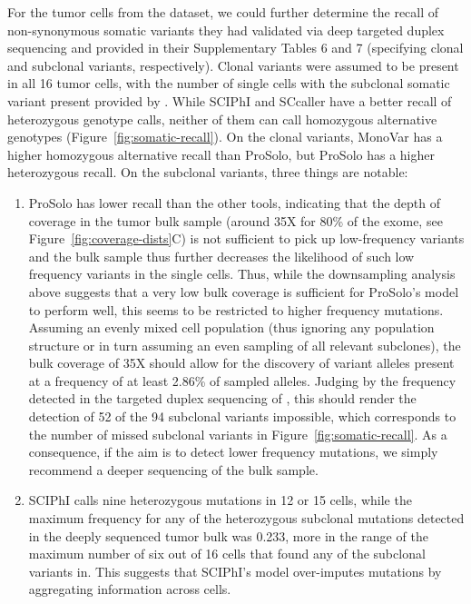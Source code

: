 \documentclass[authoryear,preprint,11pt]{scrartcl}
\begin{document}
For the tumor cells from the \cite{wang_clonal_2014} dataset, we could further determine the recall of non-synonymous somatic variants they had validated via deep targeted duplex sequencing and provided in their Supplementary Tables 6 and 7 (specifying clonal and subclonal variants, respectively).
Clonal variants were assumed to be present in all 16 tumor cells, with the number of single cells with the subclonal somatic variant present provided by \cite{wang_clonal_2014}.
While SCIPhI and SCcaller have a better recall of heterozygous genotype calls, neither of them can call homozygous alternative genotypes (Figure~\ref{fig:somatic-recall}).
On the clonal variants, MonoVar has a higher homozygous alternative recall than ProSolo, but ProSolo has a higher heterozygous recall.
On the subclonal variants, three things are notable:
\begin{enumerate}
  \item ProSolo has lower recall than the other tools, indicating that the depth of coverage in the tumor bulk sample (around 35X for 80\% of the exome, see Figure~\ref{fig:coverage-dists}C) is not sufficient to pick up low-frequency variants and the bulk sample thus further decreases the likelihood of such low frequency variants in the single cells.
  Thus, while the downsampling analysis above suggests that a very low bulk coverage is sufficient for ProSolo's model to perform well, this seems to be restricted to higher frequency mutations.
  Assuming an evenly mixed cell population (thus ignoring any population structure or in turn assuming an even sampling of all relevant subclones), the bulk coverage of 35X should allow for the discovery of variant alleles present at a frequency of at least 2.86\% of sampled alleles.
  Judging by the frequency detected in the targeted duplex sequencing of \cite{wang_clonal_2014}, this should render the detection of 52 of the 94 subclonal variants impossible, which corresponds to the number of missed subclonal variants in Figure~\ref{fig:somatic-recall}.
  As a consequence, if the aim is to detect lower frequency mutations, we simply recommend a deeper sequencing of the bulk sample.
  \item SCIPhI calls nine heterozygous mutations in 12 or 15 cells, while the maximum frequency for any of the heterozygous subclonal mutations detected in the deeply sequenced tumor bulk was 0.233, more in the range of the maximum number of six out of 16 cells that \cite{wang_clonal_2014} found any of the subclonal variants in.
  This suggests that SCIPhI's model over-imputes mutations by aggregating information across cells.

\end{enumerate}
\end{document}
